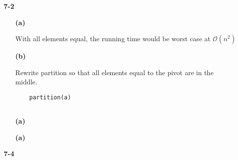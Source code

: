 \documentclass{article}
\begin{document}
\begin{enumerate}
\item[\textbf{7-2}]

	\begin{enumerate}

	\item[\textbf{(a)}]

	With all elements equal, the running time would be worst case at $\mathcal{O}(n^2)$

	\item[\textbf{(b)}]

	Rewrite partition so that all elements equal to the pivot are in the middle.

	\begin{verbatim}
	partition(a)
	
	\end{verbatim}

	\item[\textbf{(a)}]
	\item[\textbf{(a)}]

	\end{enumerate}

\item[\textbf{7-4}]

\end{enumerate}
\end{document}
